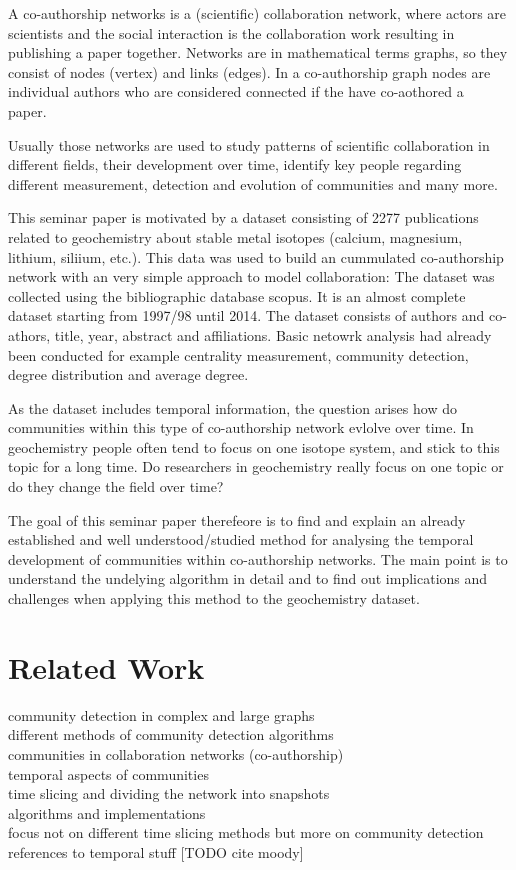 \documentclass[runningheads,a4paper]{llncs}
\begin{document}
A co-authorship networks is a (scientific) collaboration network, where actors are scientists and the social interaction is the collaboration work resulting in publishing a paper together.
Networks are in mathematical terms graphs, so they consist of nodes (vertex) and links (edges).
In a co-authorship graph nodes are individual authors who are considered connected if the have co-aothored a paper.~\cite{newman2001structure}

Usually those networks are used to study patterns of scientific collaboration in different fields, their development over time, identify key people regarding different measurement, detection and evolution of communities and many more.~\cite{barabasi2002evolution, newman2001structure, newman2004coauthorship} 

This seminar paper is motivated by a dataset consisting of 2277 publications related to geochemistry about stable metal isotopes (calcium, magnesium, lithium, siliium, etc.). This data was used to build an cummulated co-authorship network with an very simple approach to model collaboration: 
The dataset was collected using the bibliographic database scopus.
It is an almost complete dataset starting from 1997/98 until 2014.
The dataset consists of authors and co-athors, title, year, abstract and affiliations.
Basic netowrk analysis had already been conducted for example centrality measurement, community detection, degree distribution and average degree.

As the dataset includes temporal information, the question arises how do communities within this type of co-authorship network evlolve over time. In geochemistry people often tend to focus on one isotope system, and stick to this topic for a long time. Do researchers in geochemistry really focus on one topic or do they change the field over time?

The goal of this seminar paper therefeore is to find and explain an already established and well understood/studied method for analysing the temporal development of communities within co-authorship networks. The main point is to understand the undelying algorithm in detail and to find out implications and challenges when applying this method to the geochemistry dataset.

\section{Related Work}
\label{related}
community detection in complex and large graphs\\
different methods of community detection algorithms\\
communities in collaboration networks (co-authorship)\\
temporal aspects of communities\\
time slicing and dividing the network into snapshots\\
algorithms and implementations\\
focus not on different time slicing methods but more on community detection\\
references to temporal stuff [TODO cite moody]
\end{document}
